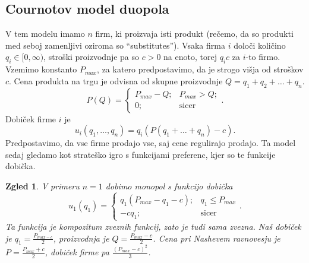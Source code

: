 \documentclass[10pt, a4paper]{article}
\newtheorem{zgled}[izr]{Zgled}
\begin{document}
\subsection{Cournotov model duopola}

V tem modelu imamo $n$ firm, ki proizvaja isti produkt (rečemo, da so produkti med seboj zamenljivi oziroma so "`substitutes"').
Vsaka firma $i$ določi količino $q_i \in [0, \infty)$, stroški proizvodnje pa so $c > 0$ na enoto, torej $q_i c$ za $i$-to firmo.
Vzemimo konstanto $P_{max}$, za katero predpostavimo, da je strogo višja od stroškov $c$.
Cena produkta na trgu je odvisna od skupne proizvodnje $Q = q_1 + q_2 + \dots + q_n$.
$$P(Q) = \begin{cases}
  P_{max} - Q; & P_{max} > Q;\\
  0; & \mathrm{sicer}
\end{cases}.$$
Dobiček firme $i$ je $$u_i (q_1, \dots, q_n) = q_i (P(q_1 + \dots + q_n) - c).$$
Predpostavimo, da vse firme prodajo vse, saj cene regulirajo prodajo.
Ta model sedaj gledamo kot strateško igro s funkcijami preferenc, kjer so te funkcije dobička.

\begin{zgled}
  V primeru $n = 1$ dobimo monopol s funkcijo dobička
  $$u_1 (q_1) = \begin{cases}
    q_1 (P_{max} - q_1 - c); & q_1 \leq P_{max}\\
    -c q_1; & \mathrm{sicer}
  \end{cases}.$$
  Ta funkcija je kompozitum zveznih funkcij, zato je tudi sama zvezna.
  Naš dobiček je $q_1 = \frac{P_{max - c}}{2}$, proizvodnja je $Q = \frac{P_{max} - c}{2}$.
  Cena pri Nashevem ravnovesju je $P = \frac{P_{max} + c}{2}$, dobiček firme pa $\frac{(P_{max} - c)^2}{3}$.  
\end{zgled}
\end{document}
